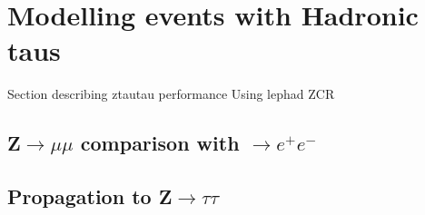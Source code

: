 \section{Modelling events with Hadronic taus}
\label{sec:lephad}

Section describing ztautau performance Using lephad ZCR

\subsection{Z$\rightarrow\mu\mu$ comparison with $\rightarrow e^+e^-$}

\subsection{Propagation to Z$\rightarrow\tau\tau$}